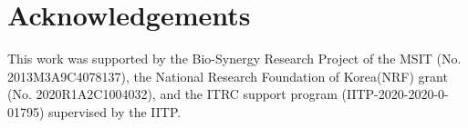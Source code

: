\documentclass[sigconf]{acmart}
\begin{document}
\section*{Acknowledgements}
This work was supported by the Bio-Synergy Research Project of the MSIT (No. 2013M3A9C4078137), the National Research Foundation of Korea(NRF) grant (No. 2020R1A2C1004032), and the ITRC support program (IITP-2020-2020-0-01795) supervised by the IITP. 



\balance 




































































\appendix
\end{document}
